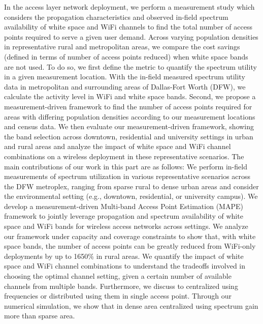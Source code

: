 In the access layer network deployment, we perform a measurement study 
which considers the propagation characteristics and observed in-field 
spectrum availability of white space and WiFi channels to find the total 
number of access points required to serve a given user demand. Across 
varying population densities in representative rural and metropolitan 
areas, we compare the cost savings (defined in terms of number of access 
points reduced) when white space bands are not used. To do so, we first 
define the metric to quantify the spectrum utility in a given measurement 
location. With the in-field measured spectrum utility data in metropolitan 
and surrounding areas of Dallas-Fort Worth (DFW), we calculate the 
activity level in WiFi and white space bands. Second, we propose a 
measurement-driven framework to find the number of access points required 
for areas with differing population densities according to our measurement 
locations and census data. We then evaluate our measurement-driven framework, 
showing the band selection across downtown, residential and university 
settings in urban and rural areas and analyze the impact of white space 
and WiFi channel combinations on a wireless deployment in these 
representative scenarios. 
The main contributions of our work in this part are as follows: We perform in-field 
measurements of spectrum utilization in various representative scenarios 
across the DFW metroplex, ranging from sparse rural to dense urban areas 
and consider the environmental setting (e.g., downtown, residential, or 
university campus). We develop a measurement-driven Multi-band Access 
Point Estimation (MAPE) framework to jointly leverage propagation and 
spectrum availability of white space and WiFi bands for wireless access 
networks across settings. We analyze our framework under capacity and 
coverage constraints to show that, with white space bands, the number 
of access points can be greatly reduced from WiFi-only deployments by 
up to 1650\% in rural areas. We quantify the impact of white space and 
WiFi channel combinations to understand the tradeoffs involved in choosing 
the optimal channel setting, given a certain number of available channels 
from multiple bands. Furthermore, we discuss to centralized using frequencies 
or distributed using them in single access point. Through our numerical 
simulation, we show that in dense area centralized using spectrum gain 
more than sparse area.


